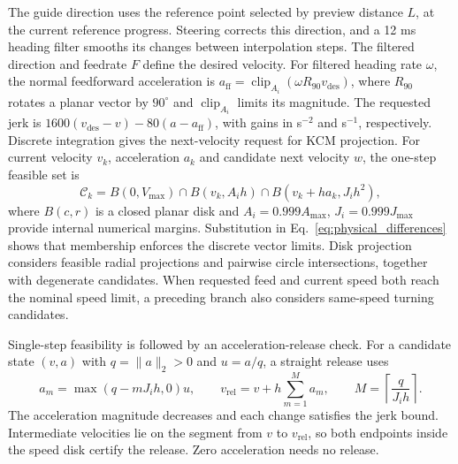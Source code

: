 \documentclass[pdflatex,sn-apa]{sn-jnl}
\begin{document}
The guide direction uses the reference point selected by preview distance $L$, at the current reference progress. Steering corrects this direction, and a 12 ms heading filter smooths its changes between interpolation steps. The filtered direction and feedrate $F$ define the desired velocity. For filtered heading rate $\omega$, the normal feedforward acceleration is $a_{\mathrm{ff}}=\operatorname{clip}_{A_i}(\omega R_{90}v_{\mathrm{des}})$, where $R_{90}$ rotates a planar vector by $90^\circ$ and $\operatorname{clip}_{A_i}$ limits its magnitude. The requested jerk is $1600(v_{\mathrm{des}}-v)-80(a-a_{\mathrm{ff}})$, with gains in s$^{-2}$ and s$^{-1}$, respectively. Discrete integration gives the next-velocity request for KCM projection. For current velocity $v_k$, acceleration $a_k$ and candidate next velocity $w$, the one-step feasible set is
\begin{equation}
\mathcal C_k=B(0,V_{\max})\cap B(v_k,A_i h)\cap B(v_k+h a_k,J_i h^2),
\label{eq:disks_main}
\end{equation}
where $B(c,r)$ is a closed planar disk and $A_i=0.999A_{\max}$, $J_i=0.999J_{\max}$ provide internal numerical margins. Substitution in Eq.~\eqref{eq:physical_differences} shows that membership enforces the discrete vector limits. Disk projection considers feasible radial projections and pairwise circle intersections, together with degenerate candidates. When requested feed and current speed both reach the nominal speed limit, a preceding branch also considers same-speed turning candidates.

Single-step feasibility is followed by an acceleration-release check. For a candidate state $(v,a)$ with $q=\|a\|_2>0$ and $u=a/q$, a straight release uses
\begin{equation}
a_m=\max(q-mJ_i h,0)u,\qquad
v_{\mathrm{rel}}=v+h\sum_{m=1}^{M}a_m,\qquad
M=\left\lceil\frac{q}{J_i h}\right\rceil.
\label{eq:release_main}
\end{equation}
The acceleration magnitude decreases and each change satisfies the jerk bound. Intermediate velocities lie on the segment from $v$ to $v_{\mathrm{rel}}$, so both endpoints inside the speed disk certify the release. Zero acceleration needs no release.
\end{document}
